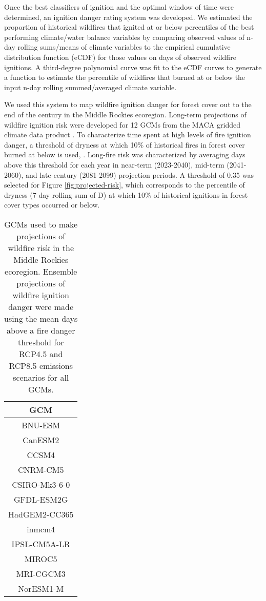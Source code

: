 \documentclass[11pt]{article}
\begin{document}
Once the best classifiers of ignition and the optimal window of time were determined, an ignition danger rating system was developed.  We estimated the proportion of historical wildfires that ignited at or below percentiles of the best performing climate/water balance variables by comparing observed values of n-day rolling sums/means of climate variables to the empirical cumulative distribution function (eCDF) for those values on days of observed wildfire ignitions. A third-degree polynomial curve was fit to the eCDF curves to generate a function to estimate the percentile of wildfires that burned at or below the input n-day rolling summed/averaged climate variable. 

We used this system to map wildfire ignition danger for forest cover out to the end of the century in the Middle Rockies ecoregion. Long-term projections of wildfire ignition risk were developed for 12 GCMs from the MACA gridded climate data product \citep{abatzoglouComparisonStatisticalDownscaling2012}. To characterize time spent at high levels of fire ignition danger, a threshold of dryness at which 10\% of historical fires in forest cover burned at below is used, .  Long-fire risk was characterized by averaging days above this threshold for each year in near-term (2023-2040), mid-term (2041-2060), and late-century (2081-2099) projection periods.  A threshold of 0.35 was selected for Figure \ref{fig:projected-risk}, which corresponds to the percentile of dryness (7 day rolling sum of D) at which 10\% of historical ignitions in forest cover types occurred or below.

\begin{table}[h!]
  \centering
  \begin{tabular}{ c }
    \hline
    GCM \\
    \hline
    BNU-ESM \\
    CanESM2 \\
    CCSM4 \\
    CNRM-CM5 \\
    CSIRO-Mk3-6-0 \\
    GFDL-ESM2G \\
    HadGEM2-CC365 \\
    inmcm4 \\
    IPSL-CM5A-LR \\
    MIROC5 \\
    MRI-CGCM3 \\
    NorESM1-M \\
    \hline
  \end{tabular}
  \caption{GCMs used to make projections of wildfire risk in the Middle Rockies ecoregion.  Ensemble projections of wildfire ignition danger were made using the mean days above a fire danger threshold for RCP4.5 and RCP8.5 emissions scenarios for all GCMs.}
  \label{table:gcms}
\end{table}
\end{document}
